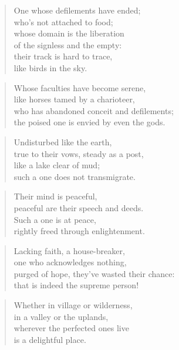 \documentclass[12pt,openany]{book}%
\begin{document}
\begin{verse}%
One whose defilements have ended; \\
who’s not attached to food; \\
whose domain is the liberation \\
of the signless and the empty: \\
their track is hard to trace, \\
like birds in the sky. 

%
\end{verse}

\begin{verse}%
Whose faculties have become serene, \\
like horses tamed by a charioteer, \\
who has abandoned conceit and defilements; \\
the poised one is envied by even the gods. 

%
\end{verse}

\begin{verse}%
Undisturbed like the earth, \\
true to their vows, steady as a post, \\
like a lake clear of mud; \\
such a one does not transmigrate. 

%
\end{verse}

\begin{verse}%
Their mind is peaceful, \\
peaceful are their speech and deeds. \\
Such a one is at peace, \\
rightly freed through enlightenment. 

%
\end{verse}

\begin{verse}%
Lacking faith, a house-breaker, \\
one who acknowledges nothing, \\
purged of hope, they’ve wasted their chance: \\
that is indeed the supreme person! 

%
\end{verse}

\begin{verse}%
Whether in village or wilderness, \\
in a valley or the uplands, \\
wherever the perfected ones live \\
is a delightful place. 

%
\end{verse}
\end{document}
